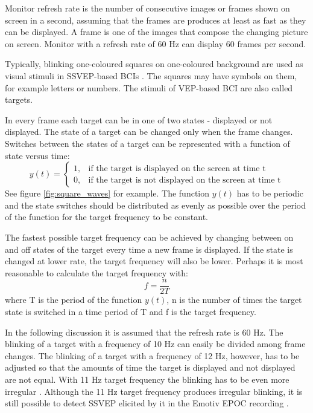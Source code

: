 Monitor refresh rate is the number of consecutive images or frames shown on screen in a second, assuming that the frames are produces at least as fast as they can be displayed. A frame is one of the images that compose the changing picture on screen. Monitor with a refresh rate of 60 Hz can display 60 frames per second. 

Typically, blinking one-coloured squares on one-coloured background are used as visual stimuli in \gls{SSVEP}-based \glspl{BCI} \cite{ssvep_stim}. The squares may have symbols on them, for example letters or numbers. The stimuli of \gls{VEP}-based \gls{BCI} are also called targets.

In every frame each target can be in one of two states - displayed or not displayed. The state of a target can be changed only when the frame changes. Switches between the states of a target can be represented with a function of state versus time:
\begin{equation}
	\label{eq:state_vs_time}
	y(t)=
	\begin{cases}
		1,	&\mbox{if the target is displayed on the screen at time t}\\
		0,	&\mbox{if the target is not displayed on the screen at time t}
	\end{cases}
\end{equation}
See figure \ref{fig:square_waves} for example. The function $y(t)$ has to be periodic and the state switches should be distributed as evenly as possible over the period of the function for the target frequency to be constant.

The fastest possible target frequency can be achieved by changing between on and off states of the target every time a new frame is displayed. If the state is changed at lower rate, the target frequency will also be lower. Perhaps it is most reasonable to calculate the target frequency with:
\begin{equation}
	f = \frac{n}{2T}
\end{equation}
where T is the period of the function $y(t)$, n is the number of times the target state is switched in a time period of T and f is the target frequency.

In the following discussion it is assumed that the refresh rate is 60 Hz. The blinking of a target with a frequency of 10 Hz can easily be divided among frame changes. The blinking of a target with a frequency of 12 Hz, however, has to be adjusted so that the amounts of time the target is displayed and not displayed are not equal. With 11 Hz target frequency the blinking has to be even more irregular \cite{11hz}. Although the 11 Hz target frequency produces irregular blinking, it is still possible to detect \gls{SSVEP} elicited by it in the Emotiv EPOC recording \cite{emotiv_11hz}.

